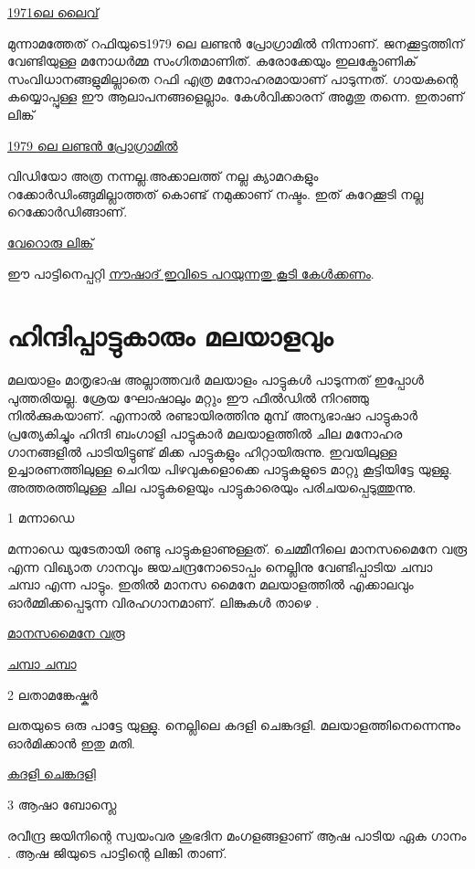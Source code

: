 \documentclass[10pt,a4paper]{report}
\begin{document}
\href{https://youtu.be/Jlx1sJcYPI4}{1971ലെ ലൈവ് }

മുന്നാമത്തേത് റഫിയുടെ1979 ലെ ലണ്ടൻ പ്രോഗ്രാമിൽ നിന്നാണ്. ജനക്കൂട്ടത്തിന് വേണ്ടിയുള്ള മനോധർമ്മ സംഗിതമാണിത്. കരോക്കേയും ഇലക്ട്രോണിക് സംവിധാനങ്ങളുമില്ലാതെ റഫി എത്ര മനോഹരമായാണ് പാടുന്നത്.
ഗായകന്റെ കയ്യൊപ്പുള്ള ഈ ആലാപനങ്ങളെല്ലാം. കേൾവിക്കാരന് അമൃതു തന്നെ. ഇതാണ് ലിങ്ക്

\href{https://youtu.be/SpkbWeMDxok}{1979 ലെ ലണ്ടൻ പ്രോഗ്രാമിൽ}

വിഡിയോ അത്ര നന്നല്ല.അക്കാലത്ത് നല്ല ക്യാമറകളും റക്കോർഡിംങ്ങുമില്ലാത്തത് കൊണ്ട് നമുക്കാണ് നഷ്ടം. ഇത് കുറേക്കൂടി നല്ല റെക്കോർഡിങ്ങാണ്.

\href{https://youtu.be/7qKoPk4McLo}{വേറൊരു ലിങ്ക് }

ഈ പാട്ടിനെപ്പറ്റി \href{https://youtu.be/Nr6CrU1cqyA} {നൗഷാദ് ഇവിടെ പറയുന്നതു കൂടി കേൾക്കണം}.


\section{ഹിന്ദിപ്പാട്ടുകാരും മലയാളവും}
 

മലയാളം മാതൃഭാഷ അല്ലാത്തവർ മലയാളം പാട്ടുകൾ പാടുന്നത് ഇപ്പോൾ പുത്തരിയല്ല. ശ്രേയ ഘോഷാലും മറ്റും ഈ ഫീൽഡിൽ നിറഞ്ഞു നിൽക്കുകയാണ്. എന്നാൽ രണ്ടായിരത്തിനു മുമ്പ് അന്യഭാഷാ പാട്ടുകാർ പ്രത്യേകിച്ചും ഹിന്ദി ബംഗാളി പാട്ടുകാർ മലയാളത്തിൽ ചില മനോഹര ഗാനങ്ങളിൽ പാടിയിട്ടുണ്ട് മിക്ക പാട്ടുകളും ഹിറ്റായിരുന്നു. ഇവയിലുള്ള ഉച്ചാരണത്തിലുള്ള ചെറിയ പിഴവുകളൊക്കെ പാട്ടുകളുടെ മാറ്റു കൂട്ടിയിട്ടേ യുള്ളു. അത്തരത്തിലുള്ള ചില പാട്ടുകളെയും പാട്ടുകാരെയും പരിചയപ്പെടുത്തുന്നു.

1 മന്നാഡെ

മന്നാഡെ യുടേതായി രണ്ടു പാട്ടുകളാണുള്ളത്. ചെമ്മീനിലെ മാനസമൈനേ വരൂ എന്ന വിഖ്യാത ഗാനവും ജയചന്ദ്രനോടൊപ്പം നെല്ലിനു വേണ്ടിപ്പാടിയ ചമ്പാ ചമ്പാ എന്ന പാട്ടും. ഇതിൽ മാനസ മൈനേ മലയാളത്തിൽ എക്കാലവും ഓർമ്മിക്കപ്പെടുന്ന വിരഹഗാനമാണ്. ലിങ്കുകൾ താഴെ .

\href{https://youtu.be/W4FHG5baLOM}{മാനസമൈനേ വരൂ}

\href{https://youtu.be/aX1yQIwSLuw}{ചമ്പാ ചമ്പാ}

2 ലതാമങ്കേഷ്കർ

ലതയുടെ ഒരു പാട്ടേ യുള്ളു. നെല്ലിലെ കദളി ചെങ്കദളി. മലയാളത്തിനെന്നെന്നും ഓർമിക്കാൻ ഇതു മതി.

\href{https://youtu.be/Hh_Ne01I_UA}{കദളി ചെങ്കദളി}

3 ആഷാ ബോസ്ലെ

രവീന്ദ്ര ജയിനിന്റെ സ്വയംവര ശുഭദിന മംഗളങ്ങളാണ് ആഷ പാടിയ ഏക ഗാനം .
ആഷ ജിയുടെ പാട്ടിന്റെ ലിങ്കി താണ്‌. 
\end{document}
